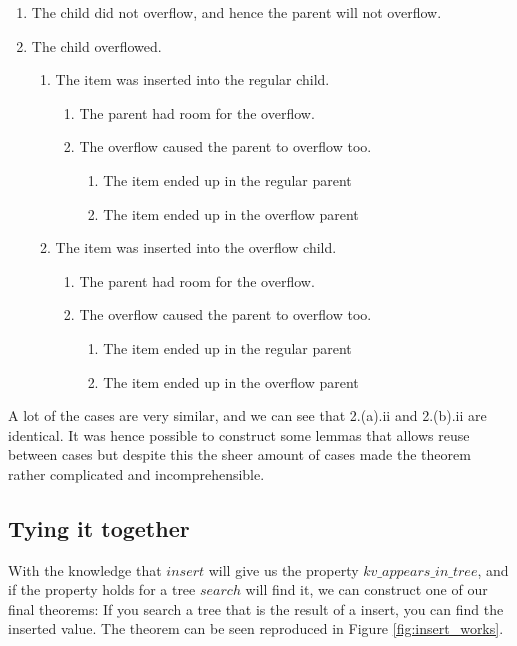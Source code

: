 \begin{enumerate}
  \item The child did not overflow, and hence the parent will not overflow. 
  \item The child overflowed.
  \begin{enumerate}
    \item The item was inserted into the regular child.
    \begin{enumerate}
      \item The parent had room for the overflow.
      \item The overflow caused the parent to overflow too.
      \begin{enumerate}
        \item The item ended up in the regular parent
        \item The item ended up in the overflow parent
      \end{enumerate}
    \end{enumerate}
    \item The item was inserted into the overflow child.
    \begin{enumerate}
      \item The parent had room for the overflow.
      \item The overflow caused the parent to overflow too.
      \begin{enumerate}
        \item The item ended up in the regular parent
        \item The item ended up in the overflow parent
      \end{enumerate}
    \end{enumerate}
  \end{enumerate}
\end{enumerate}

A lot of the cases are very similar, and we can see that 2.(a).ii and 2.(b).ii are identical. It was hence possible to construct some lemmas that allows reuse between cases but despite this the sheer amount of cases made the theorem rather complicated and incomprehensible. 

\subsection{Tying it together}

With the knowledge that $insert$ will give us the property $kv\_appears\_in\_tree$, and if the property holds for a tree $search$ will find it, we can construct one of our final theorems: If you search a tree that is the result of a insert, you can find the inserted value. The theorem can be seen reproduced in Figure \ref{fig:insert_works}.

